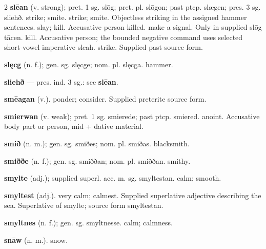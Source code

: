 \begin{multicols*}{2}
\textbf{slēan} (v. strong); pret. 1 sg. slōg; pret. pl. slōgon; past ptcp. slægen; pres. 3 sg. sliehð. strike; smite. strike; smite. Objectless striking in the assigned hammer sentences. slay; kill. Accusative person killed. make a signal. Only in supplied slōg tācen. kill. Accusative person; the bounded negative command uses selected short-vowel imperative sleah. strike. Supplied past source form.\par
\textbf{slęcg} (n. f.); gen. sg. slęcge; nom. pl. slęcga. hammer.\par
\textbf{sliehð} — pres. ind. 3 sg.: see \textbf{slēan}.\par
\textbf{smēagan} (v.). ponder; consider. Supplied preterite source form.\par
\textbf{smierwan} (v. weak); pret. 1 sg. smierede; past ptcp. smiered. anoint. Accusative body part or person, mid + dative material.\par
\textbf{smið} (n. m.); gen. sg. smiðes; nom. pl. smiðas. blacksmith.\par
\textbf{smiððe} (n. f.); gen. sg. smiððan; nom. pl. smiððan. smithy.\par
\textbf{smylte} (adj.); supplied superl. acc. m. sg. smyltestan. calm; smooth.\par
\textbf{smyltest} (adj.). very calm; calmest. Supplied superlative adjective describing the sea. Superlative of smylte; source form smyltestan.\par
\textbf{smyltnes} (n. f.); gen. sg. smyltnesse. calm; calmness.\par
\textbf{snāw} (n. m.). snow.\par

\end{multicols*}
